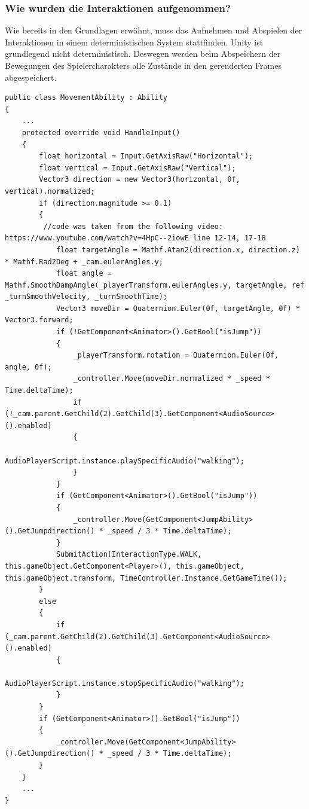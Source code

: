 \subsubsection{Wie wurden die Interaktionen aufgenommen?}\label{sec:good_05}
Wie bereits in den Grundlagen erwähnt, muss das Aufnehmen und Abspielen der Interaktionen in einem deterministischen System stattfinden. Unity ist grundlegend nicht deterministisch. Deswegen werden beim Abspeichern der Bewegungen des Spielercharakters alle Zustände in den gerenderten Frames abgespeichert.
\begin{lstlisting}[caption={Aufnahme von Bewegungen, Ausschnitt aus MovementAbility.cs}, label={sec:movementAbility_old}]
public class MovementAbility : Ability
{
    ...
    protected override void HandleInput()
    {
        float horizontal = Input.GetAxisRaw("Horizontal");
        float vertical = Input.GetAxisRaw("Vertical");
        Vector3 direction = new Vector3(horizontal, 0f, vertical).normalized;
        if (direction.magnitude >= 0.1)
        {
         //code was taken from the following video: https://www.youtube.com/watch?v=4HpC--2iowE line 12-14, 17-18
            float targetAngle = Mathf.Atan2(direction.x, direction.z) * Mathf.Rad2Deg + _cam.eulerAngles.y;
            float angle = Mathf.SmoothDampAngle(_playerTransform.eulerAngles.y, targetAngle, ref _turnSmoothVelocity, _turnSmoothTime);
            Vector3 moveDir = Quaternion.Euler(0f, targetAngle, 0f) * Vector3.forward;
            if (!GetComponent<Animator>().GetBool("isJump"))
            {
                _playerTransform.rotation = Quaternion.Euler(0f, angle, 0f);
                _controller.Move(moveDir.normalized * _speed * Time.deltaTime);
                if (!_cam.parent.GetChild(2).GetChild(3).GetComponent<AudioSource>().enabled)
                {
                    AudioPlayerScript.instance.playSpecificAudio("walking");
                }
            }
            if (GetComponent<Animator>().GetBool("isJump"))
            {
                _controller.Move(GetComponent<JumpAbility>().GetJumpdirection() * _speed / 3 * Time.deltaTime);
            }
            SubmitAction(InteractionType.WALK, this.gameObject.GetComponent<Player>(), this.gameObject, this.gameObject.transform, TimeController.Instance.GetGameTime());
        }
        else
        {
            if (_cam.parent.GetChild(2).GetChild(3).GetComponent<AudioSource>().enabled)
            {
                AudioPlayerScript.instance.stopSpecificAudio("walking");
            }
        }
        if (GetComponent<Animator>().GetBool("isJump"))
        {
            _controller.Move(GetComponent<JumpAbility>().GetJumpdirection() * _speed / 3 * Time.deltaTime);
        }
    }
    ...
}
\end{lstlisting}
